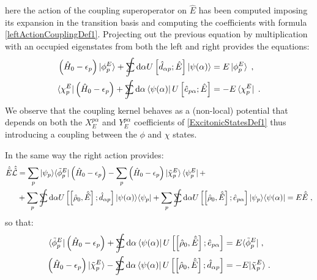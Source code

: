 \documentclass[a4paper]{article}
\newcommand{\dd}{{\rm d}}
\newcommand{\eps}{\epsilon}
\newcommand{\sint}{\mathrlap{\displaystyle\int}
\mathrlap{\textstyle\sum}
\phantom{\mathrlap{\displaystyle
\int}\textstyle\sum}}
\newcommand{\nn}{\notag}
\newcommand{\lb}{\label}
\newcommand{\op}[1]{\hat {#1}}
\newcommand{\sop}[1]{\op{\op {#1}}}
\newcommand{\commutator}[2]{\left[ {#1} , {#2} \right]}
\newcommand{\tket}[1]{| \tilde #1 \rangle}
\newcommand{\tbra}[1]{\langle \tilde #1 |}
\newcommand{\ketbra}[2]{| #1 \rangle \langle #2 |}
\newcommand{\tketbra}[2]{| #1 \rangle \langle \tilde #2 |}
\newcommand{\dmnot}{\op{\rho}_0}
\newcommand{\hnot}{\op{H}_0}
\newcommand{\excite}[2]{\op e_{{#1}{#2}}}
\newcommand{\decay}[2]{\op d_{{#1}{#2}}}
\newcommand{\Liouv}{\sop{\mathcal L}}
\begin{document}
here the action of the coupling superoperator on $\op E$ has been computed imposing its expansion in the transition basis and computing the coefficients with formula 
\eqref{leftActionCouplingDef1}. Projecting out the previous equation by multiplication with an occupied eigenstates from both the left and right provides the equations:
\begin{align}\lb{PhipChipEqDef1}
\left(\hnot-\eps_p\right)\ket{\phi^E_p} +\sint \dd\alpha  U\left[\decay{\alpha}{p}; \op E\right] \ket{\psi(\alpha)} &= E\ket{\phi^E_p} \;,\nn \\
\bra{\chi^E_p}\left(\hnot-\eps_p\right) +\sint \dd\alpha \bra{\psi(\alpha)} U\left[\excite{p}{\alpha}; \op E\right] &= -E\bra{\chi^E_p} \;.
\end{align}
We observe that the coupling kernel behaves as a (non-local) potential that depends on both the $X_{E}^{p \alpha}$ and $Y_{E}^{p \alpha}$ coefficients of \eqref{ExcitonicStatesDef1}
thus introducing a coupling between the $\phi$ and $\chi$ states. 

In the same way the right action provides:
\begin{align}
\op{\tilde E}\Liouv &= \sum_p\tketbra{\psi_p}{\phi^E_p}\left(\hnot-\eps_p\right) - \sum_p\left(\hnot-\eps_p\right)\tket{\chi^E_p}\bra{\psi^E_p} + \nn \\
&+ \sum_p \sint \dd\alpha  U\left[\commutator{\dmnot}{\op{\tilde E}};\decay{\alpha}{p}\right] \ketbra{\psi(\alpha)}{\psi_p}
+ \sum_p \sint \dd\alpha U\left[\commutator{\dmnot}{\op{\tilde E}};\excite{p}{\alpha}\right] \ketbra{\psi_p}{\psi(\alpha)} = E\op{\tilde E} \;, \nn
\end{align}
so that:
\begin{align}\lb{TildePhipChipEqDef1}
\tbra{\phi^E_p}\left(\hnot-\eps_p\right) +\sint \dd\alpha \bra{\psi(\alpha)} U\left[\commutator{\dmnot}{\op{\tilde E}};\excite{p}{\alpha}\right]  &= E\tbra{\phi^E_p} \;,\nn \\
\left(\hnot-\eps_p\right)\tket{\chi^E_p} -\sint \dd\alpha \bra{\psi(\alpha)} U\left[\commutator{\dmnot}{\op{\tilde E}};\decay{\alpha}{p}\right] &= -E\tket{\chi^E_p} \;.
\end{align}
\end{document}
